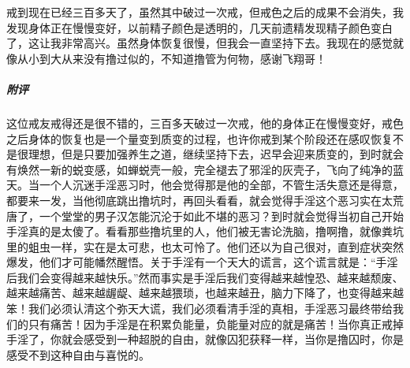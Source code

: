 \begin{case}
    戒到现在已经三百多天了，虽然其中破过一次戒，但戒色之后的成果不会消失，我发现身体正在慢慢变好，以前精子颜色是透明的，几天前遗精发现精子颜色变白了，这让我非常高兴。虽然身体恢复很慢，但我会一直坚持下去。我现在的感觉就像从小到大从来没有撸过似的，不知道撸管为何物，感谢飞翔哥！
    \subparagraph{附评} 这位戒友戒得还是很不错的，三百多天破过一次戒，他的身体正在慢慢变好，戒色之后身体的恢复也是一个量变到质变的过程，也许你戒到某个阶段还在感叹恢复不是很理想，但是只要加强养生之道，继续坚持下去，迟早会迎来质变的，到时就会有焕然一新的蜕变感，如蝉蜕壳一般，完全褪去了邪淫的灰壳子，飞向了纯净的蓝天。当一个人沉迷手淫恶习时，他会觉得那是他的全部，不管生活失意还是得意，都要来一发，当他彻底跳出撸坑时，再回头看看，就会觉得手淫这个恶习实在太荒唐了，一个堂堂的男子汉怎能沉沦于如此不堪的恶习？到时就会觉得当初自己开始手淫真的是太傻了。看看那些撸坑里的人，他们被无害论洗脑，撸啊撸，就像粪坑里的蛆虫一样，实在是太可悲，也太可怜了。他们还以为自己很对，直到症状突然爆发，他们才可能幡然醒悟。关于手淫有一个天大的谎言，这个谎言就是：“手淫后我们会变得越来越快乐。”然而事实是手淫后我们变得越来越惶恐、越来越颓废、越来越痛苦、越来越龌龊、越来越猥琐，也越来越丑，脑力下降了，也变得越来越笨！我们必须认清这个弥天大谎，我们必须看清手淫的真相，手淫恶习最终带给我们的只有痛苦！因为手淫是在积累负能量，负能量对应的就是痛苦！当你真正戒掉手淫了，你就会感受到一种超脱的自由，就像囚犯获释一样，当你是撸囚时，你是感受不到这种自由与喜悦的。
\end{case}

